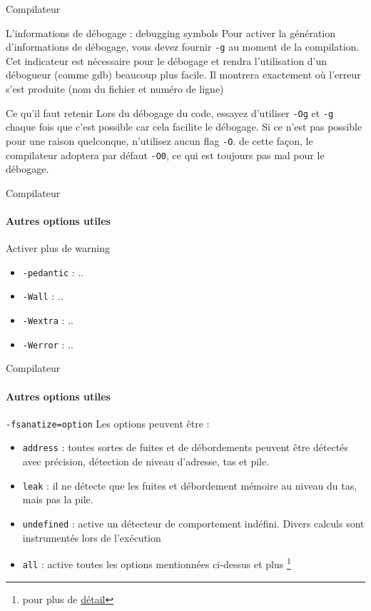 \begin{frame}{Compilateur}
	\begin{block}{L'informations de débogage : debugging symbols}
		Pour activer la génération \alert{d'informations de débogage}, vous devez fournir \alert{\texttt{-g}} au moment de la compilation. Cet indicateur est nécessaire pour le débogage et rendra l'utilisation d'un débogueur (comme gdb) beaucoup plus facile. Il montrera exactement où l'erreur s'est produite (nom du fichier et numéro de ligne)
	\end{block}
	\begin{alertblock}{Ce qu'il faut retenir}
		Lors du \alert{débogage} du code, essayez d'utiliser \texttt{-Og} et \texttt{-g} chaque fois que c'est possible car cela facilite le débogage. Si ce n'est pas possible pour une raison quelconque, n'utilisez aucun flag \texttt{-O}. de cette façon, le compilateur adoptera par défaut \texttt{-O0}, ce qui est toujours pas mal pour le débogage.
	\end{alertblock}
\end{frame}

\begin{frame}{Compilateur}
	\framesubtitle{Autres options utiles}
	\begin{block}{Activer plus de warning}
		\begin{itemize}
			\item \texttt{-pedantic} : ..
			\item \texttt{-Wall} : ..
			\item \texttt{-Wextra} : ..
			\item \texttt{-Werror} : ..
		\end{itemize}
	\end{block}
\end{frame}

\begin{frame}{Compilateur}
	\framesubtitle{Autres options utiles}
	\begin{block}{\texttt{-fsanatize=option}}
		Les options peuvent être :
		\begin{itemize}
			\item \alert{\texttt{address}} : toutes sortes de fuites et de débordements peuvent être détectés avec précision, détection de niveau d'adresse, tas et pile.
			\item \alert{\texttt{leak}} : il ne détecte que les fuites et débordement mémoire au niveau du tas, mais pas la pile.
			\item \alert{\texttt{undefined}} : active un détecteur de comportement indéfini. Divers calculs sont instrumentés lors de l'exécution
			\item \alert{\texttt{all}} : active toutes les options mentionnées ci-dessus et plus \footnote[frame]{pour plus de \href{https://gcc.gnu.org/onlinedocs/gcc-5.3.0/gcc/Debugging-Options.html}{détail}}
		\end{itemize}
	\end{block}
\end{frame}


